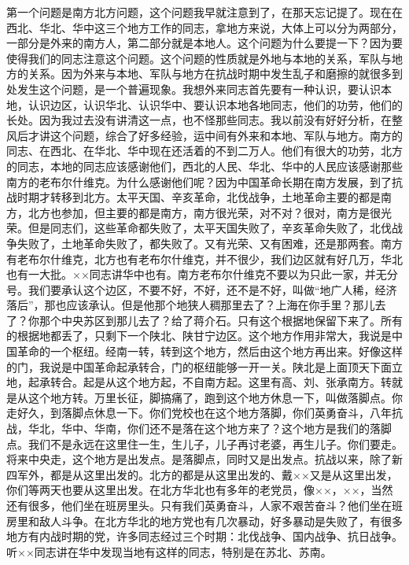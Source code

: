 第一个问题是南方北方问题，这个问题我早就注意到了，在那天忘记提了。现在在西北、华北、华中这三个地方工作的同志，拿地方来说，大体上可以分为两部分，一部分是外来的南方人，第二部分就是本地人。这个问题为什么要提一下？因为要使得我们的同志注意这个问题。这个问题的性质就是外地与本地的关系，军队与地方的关系。因为外来与本地、军队与地方在抗战时期中发生乱子和磨擦的就很多到处发生这个问题，是一个普遍现象。我想外来同志首先要有一种认识，要认识本地，认识边区，认识华北、认识华中、要认识本地各地同志，他们的功劳，他们的长处。因为我过去没有讲清这一点，也不怪那些同志。我以前没有好好分析，在整风后才讲这个问题，综合了好多经验，运中间有外来和本地、军队与地方。南方的同志、在西北、在华北、华中现在还活着的不到二万人。他们有很大的功劳，北方的同志，本地的同志应该感谢他们，西北的人民、华北、华中的人民应该感谢那些南方的老布尔什维克。为什么感谢他们呢？因为中国革命长期在南方发展，到了抗战时期才转移到北方。太平天国、辛亥革命，北伐战争，土地革命主要的都是南方，北方也参加，但主要的都是南方，南方很光荣，对不对？很对，南方是很光荣。但是同志们，这些革命都失败了，太平天国失败了，辛亥革命失败了，北伐战争失败了，土地革命失败了，都失败了。又有光荣、又有困难，还是那两套。南方有老布尔什维克，北方也有老布尔什维克，并不很少，我们边区就有好几万，华北也有一大批。××同志讲华中也有。南方老布尔什维克不要以为只此一家，并无分号。我们要承认这个边区，不要不好，不好，还不是不好，叫做“地广人稀，经济落后”，那也应该承认。但是他那个地狭人稠那里去了？上海在你手里？那儿去了？你那个中央苏区到那儿去了？给了蒋介石。只有这个根据地保留下来了。所有的根据地都丢了，只剩下一个陕北、陕甘宁边区。这个地方作用非常大，我说是中国革命的一个枢纽。经南一转，转到这个地方，然后由这个地方再出来。好像这样的门，我说是中国革命起承转合，门的枢纽能够一开一关。陕北是上面顶天下面立地，起承转合。起是从这个地方起，不自南方起。这里有高、刘、张承南方。转就是从这个地方转。万里长征，脚搞痛了，跑到这个地方休息一下，叫做落脚点。你走好久，到落脚点休息一下。你们党校也在这个地方落脚，你们英勇奋斗，八年抗战，华北，华中、华南，你们还不是落在这个地方来了？这个地方是我们的落脚点。我们不是永远在这里住一生，生儿子，儿子再讨老婆，再生儿子。你们要走。将来中央走，这个地方是出发点。是落脚点，同时又是出发点。抗战以来，除了新四军外，都是从这里出发的。北方的都是从这里出发的、戴××又是从这里出发，你们等两天也要从这里出发。在北方华北也有多年的老党员，像××，××，当然还有很多，他们坐在班房里头。只有我们英勇奋斗，人家不艰苦奋斗？他们坐在班房里和敌人斗争。在北方华北的地方党也有几次暴动，好多暴动是失败了，有很多地方有内战时期的党，许多同志经过三个时期：北伐战争、国内战争、抗日战争。听××同志讲在华中发现当地有这样的同志，特别是在苏北、苏南。

